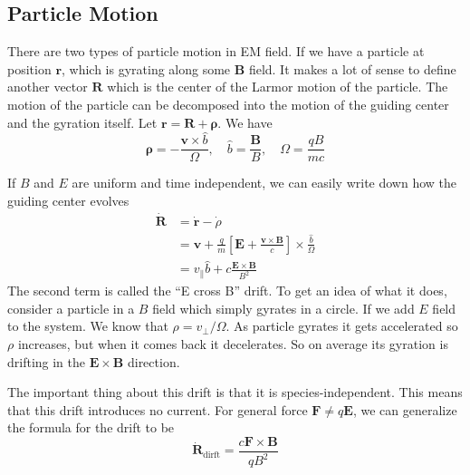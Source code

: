 \documentclass[letterpaper, 11pt]{article}
\numberwithin{equation}{section}
\numberwithin{figure}{section}
\begin{document}
\subsection{Particle Motion}

There are two types of particle motion in EM field. If we have a particle at
position $\mathbf{r}$, which is gyrating along some $\mathbf{B}$ field. It makes
a lot of sense to define another vector $\mathbf{R}$ which is the center of the
Larmor motion of the particle. The motion of the particle can be decomposed into
the motion of the guiding center and the gyration itself. Let $\mathbf{r} =
\mathbf{R} + \mathbf{\rho}$. We have
\begin{equation}
  \label{eq:22}
  \mathbf{\rho} = -\frac{\mathbf{v}\times \hat{b}}{\Omega}, \quad \hat{b} = \frac{\mathbf{B}}{B},\quad \Omega = \frac{qB}{mc}
\end{equation}

If $B$ and $E$ are uniform and time independent, we can easily write down how
the guiding center evolves
\begin{equation}
  \label{eq:23}
  \begin{split}
    \dot{\mathbf{R}} &= \dot{\mathbf{r}} - \dot{\rho} \\
    &= \mathbf{v} + \frac{q}{m}\left[ \mathbf{E} + \frac{\mathbf{v}\times \mathbf{B}}{c} \right]\times\frac{\hat{b}}{\Omega} \\
    &= v_{\parallel}\hat{b} + c\frac{\mathbf{E} \times \mathbf{B}}{B^2}
  \end{split}
\end{equation}
The second term is called the ``E cross B'' drift. To get an idea of what it
does, consider a particle in a $B$ field which simply gyrates in a circle. If we
add $E$ field to the system. We know that $\rho = v_{\perp}/\Omega$. As particle
gyrates it gets accelerated so $\rho$ increases, but when it comes back it
decelerates. So on average its gyration is drifting in the $\mathbf{E}\times
\mathbf{B}$ direction.

The important thing about this drift is that it is species-independent. This
means that this drift introduces no current. For general force $\mathbf{F} \neq
q\mathbf{E}$, we can generalize the formula for the drift to be
\begin{equation}
  \label{eq:24}
  \dot{\mathbf{R}}_\mathrm{dirft} = \frac{c \mathbf{F}\times \mathbf{B}}{qB^2}
\end{equation}
\end{document}
